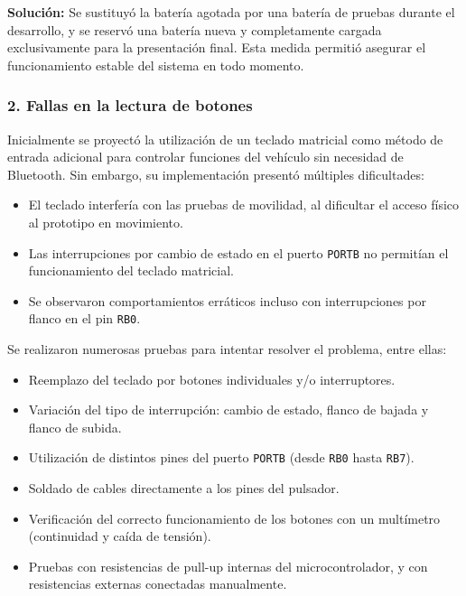 \documentclass[]{article}
\begin{document}
	\textbf{Solución:} Se sustituyó la batería agotada por una batería de pruebas durante el desarrollo, y se reservó una batería nueva y completamente cargada exclusivamente para la presentación final. Esta medida permitió asegurar el funcionamiento estable del sistema en todo momento.
	
	\subsubsection{2. Fallas en la lectura de botones}
	
	Inicialmente se proyectó la utilización de un teclado matricial como método de entrada adicional para controlar funciones del vehículo sin necesidad de Bluetooth. Sin embargo, su implementación presentó múltiples dificultades:
	
	\begin{itemize}
		\item El teclado interfería con las pruebas de movilidad, al dificultar el acceso físico al prototipo en movimiento.
		\item Las interrupciones por cambio de estado en el puerto \texttt{PORTB} no permitían el funcionamiento del teclado matricial.
		
		\newpage
		\thispagestyle{fancy}
		
		\item Se observaron comportamientos erráticos incluso con interrupciones por flanco en el pin \texttt{RB0}.
	\end{itemize}
	
	Se realizaron numerosas pruebas para intentar resolver el problema, entre ellas:
	
	\begin{itemize}
		\item Reemplazo del teclado por botones individuales y/o interruptores.
		\item Variación del tipo de interrupción: cambio de estado, flanco de bajada y flanco de subida.
		\item Utilización de distintos pines del puerto \texttt{PORTB} (desde \texttt{RB0} hasta \texttt{RB7}).
		\item Soldado de cables directamente a los pines del pulsador.
		\item Verificación del correcto funcionamiento de los botones con un multímetro (continuidad y caída de tensión).
		\item Pruebas con resistencias de pull-up internas del microcontrolador, y con resistencias externas conectadas manualmente.
	\end{itemize}
	
\end{document}
